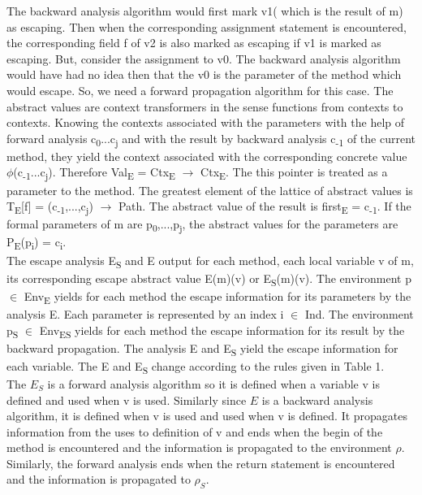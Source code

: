\documentclass[peerreview]{IEEEtran}
\begin{document}
The backward analysis algorithm would first mark v1( which is the result of m) as escaping. Then when the corresponding assignment statement is encountered, the corresponding field f of v2 is also marked as escaping if v1 is marked as escaping. But, consider the assignment to v0. The backward analysis algorithm would have had no idea then that the v0 is the parameter of the method which would escape. So, we need a forward propagation algorithm for this case. The abstract values are context transformers in the sense functions from contexts to contexts. Knowing the contexts associated with the parameters with the help of forward analysis c\textsubscript{0}...c\textsubscript{j} and with the result by backward analysis c\textsubscript{-1} of the current method, they yield the context associated with the corresponding concrete value $\phi$(c\textsubscript{-1}...c\textsubscript{j}). Therefore Val\textsubscript{E} = Ctx\textsubscript{E}\* $\rightarrow$ Ctx\textsubscript{E}. The this pointer is treated as a parameter to the method. The greatest element of the lattice of abstract values is T\textsubscript{E}[f] = {(c\textsubscript{-1},...,c\textsubscript{j}) $\rightarrow$ Path}. The abstract value of the result is first\textsubscript{E} = c\textsubscript{-1}. If the formal parameters of m are p\textsubscript{0},...,p\textsubscript{j}, the abstract values for the parameters are P\textsubscript{E}(p\textsubscript{i}) = c\textsubscript{i}. \\
The escape analysis E\textsubscript{S} and E output for each method, each local variable v of m, its corresponding escape abstract value E(m)(v) or E\textsubscript{S}(m)(v). The environment p $\in$ Env\textsubscript{E} yields for each method the escape information for its parameters by the analysis E. Each parameter is represented by an index i $\in$ Ind. The environment p\textsubscript{S} $\in$ Env\textsubscript{ES} yields for each method the escape information for its result by the backward propagation. The analysis E and E\textsubscript{S} yield the escape information for each variable. The E and E\textsubscript{S} change according to the rules given in Table 1. \\
The $E_S$ is a forward analysis algorithm so it is defined when a variable v is defined and used when v is used. Similarly since $E$ is a backward analysis algorithm, it is defined when v is used and used when v is defined. It propagates information from the uses to definition of v and ends when the begin of the method is encountered and the information is propagated to the environment $\rho$. Similarly, the forward analysis ends when the return statement is encountered and the information is propagated to $\rho_S$. \\
\end{document}
